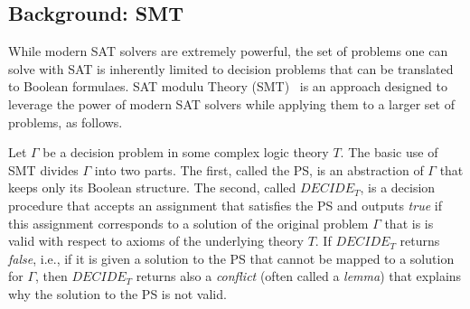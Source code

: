 \documentclass[review]{elsarticle}
\newcommand{\decidet}{\ensuremath{\mathit{DECIDE_T}}\xspace}
\newcommand{\ps}{\ac{PS}\xspace}
\newcommand{\true}{\textit{true}\xspace}
\newcommand{\false}{\textit{false}\xspace}
\begin{document}



\subsection{Background: SMT}


While modern SAT solvers are extremely powerful, the set of problems one can solve with SAT is inherently limited to decision problems that can be translated to Boolean formulaes. 
SAT modulu Theory (SMT)~\cite{DBLP:journals/jacm/NieuwenhuisOT06,DBLP:journals/constraints/BofillPSV12,DBLP:conf/cp/Nieuwenhuis10} is an approach designed to leverage the power of modern SAT solvers while applying them to a larger set of problems, as follows. 


Let $\Gamma$ be a decision problem in some complex logic theory $T$. 
The basic use of SMT divides $\Gamma$ into two parts. The first, called the \ps, is an abstraction of $\Gamma$ that keeps only its Boolean structure. The second, called \decidet, is a decision procedure that accepts an assignment that satisfies the \ps and outputs \true if this assignment 
corresponds to a solution of the original problem $\Gamma$ that is 
is valid with respect to axioms of the underlying theory $T$. 
If \decidet returns \false, i.e., if it is given a solution to the \ps that cannot be mapped to a solution for $\Gamma$, then \decidet returns also a \emph{conflict}  (often called a {\em lemma}) that explains why the solution to the \ps is not valid. 
\end{document}
